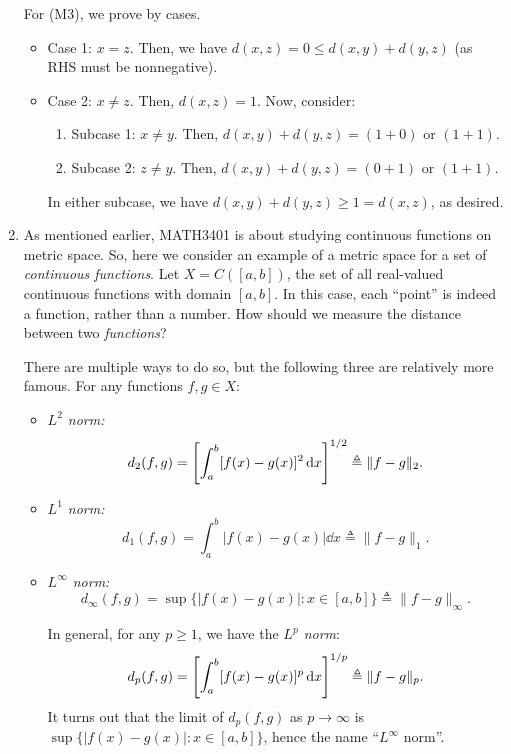 \begin{enumerate}
\begin{pf}
For (M3), we prove by cases.
\begin{itemize}
\item Case 1: \(x=z\). Then, we have \(d(x,z)=0\le d(x,y)+d(y,z)\) (as RHS must
be nonnegative).
\item Case 2: \(x\ne z\). Then, \(d(x,z)=1\). Now, consider:
\begin{enumerate}
\item Subcase 1: \(x\ne y\). Then, \(d(x,y)+d(y,z)=(1+0)\text{ or }(1+1)\).
\item Subcase 2: \(z\ne y\). Then, \(d(x,y)+d(y,z)=(0+1)\text{ or }(1+1)\).
\end{enumerate}
In either subcase, we have \(d(x,y)+d(y,z)\ge 1=d(x,z)\), as desired.
\end{itemize}
\end{pf}
\item \label{it:fun-ms-lp-norm}
As mentioned earlier, MATH3401 is about studying continuous functions on
metric space. So, here we consider an example of a metric space for a set of
\emph{continuous functions}. Let \(X=C([a,b])\), the set of all real-valued
continuous functions with domain \([a,b]\). In this case, each ``point'' is
indeed a function, rather than a number. How should we measure the
distance between two \emph{functions}?

There are multiple ways to do so, but the following three are relatively more
famous. For any functions \(f,g\in X\):
\begin{itemize}
\item \textit{\(L^2\) norm:}
\[
d_2(f,g)=\qty[\int_{a}^{b}[f(x)-g(x)]^{2}\dd{x}]^{1/2}\triangleq\|f-g\|_{2}.
\]
\item \textit{\(L^1\) norm:}
\[
d_1(f,g)=\int_{a}^{b}|f(x)-g(x)|\dd{x}\triangleq\|f-g\|_{1}.
\]
\item \textit{\(L^{\infty}\) norm:}
\[
d_{\infty}(f,g)=\sup\{|f(x)-g(x)|:x\in[a,b]\}\triangleq\|f-g\|_{\infty}.
\]
\begin{note}
In general, for any \(p\ge 1\), we have the \emph{\(L^p\) norm}:
\[
d_p(f,g)=\qty[\int_{a}^{b}[f(x)-g(x)]^{p}\dd{x}]^{1/p}\triangleq\|f-g\|_{p}.
\]
It turns out that the limit of \(d_{p}(f,g)\) as \(p\to\infty\) is
\(\sup\{|f(x)-g(x)|:x\in[a,b]\}\), hence the name ``\(L^\infty\) norm''.
\end{note}


\end{itemize}
\end{enumerate}
